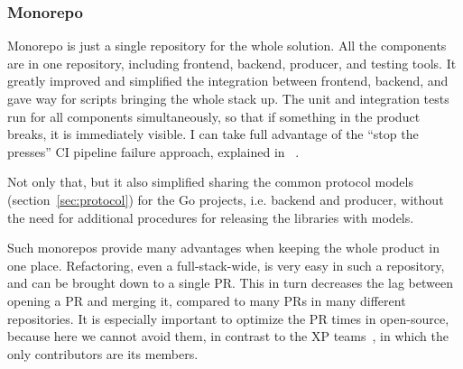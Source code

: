 \subsubsection{Monorepo}\label{sec:monorepo}

Monorepo is just a single repository
for the whole solution.
All the components are in one repository,
including frontend,
backend,
producer, and
testing tools.
It greatly improved and simplified
the integration between frontend, backend,
and gave way for scripts
bringing the whole stack up.
The unit and integration tests run for all
components simultaneously,
so that if something in the product breaks,
it is immediately visible.
I can take full advantage of the
``stop the presses'' \ac{CI} pipeline failure approach,
explained in ~\cite{martin_clean_2011}.

Not only that,
but it also simplified sharing
the common protocol models (section~\ref{sec:protocol})
for the Go projects, i.e. backend and producer,
without the need for additional procedures
for releasing the libraries with models.

Such monorepos provide many advantages
when keeping the whole product in one place.
Refactoring,
even a full-stack-wide,
is very easy in such a repository,
and can be brought down to a single \ac{PR}.
This in turn decreases the lag between
opening a \ac{PR} and merging it,
compared to many \acp{PR} in many different repositories.
It is especially important
to optimize the \ac{PR} times in open-source,
because here we cannot avoid them,
in contrast to the \ac{XP} teams~\cite{beck_extreme_2004},
in which the only contributors are its members.
